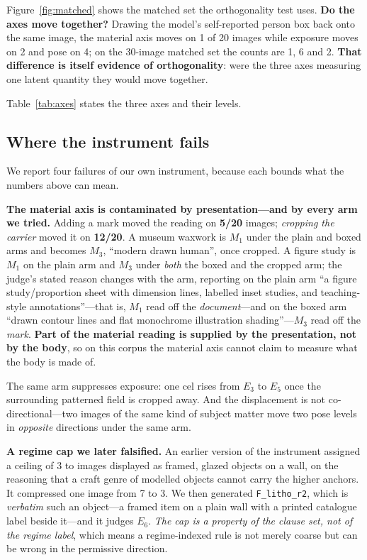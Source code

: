 \documentclass[11pt]{article}
\newcommand{\axm}{M}
\newcommand{\axe}{E}
\begin{document}
Figure~\ref{fig:matched} shows the matched set the orthogonality test uses. \textbf{Do the axes move together?} Drawing the model's self-reported person
box back onto the same image, the material axis moves on 1 of 20 images while
exposure moves on 2 and pose on 4; on the 30-image matched set the counts are
1, 6 and 2. \textbf{That difference is itself evidence of orthogonality}: were
the three axes measuring one latent quantity they would move together.

Table~\ref{tab:axes} states the three axes and their levels. \subsection{Where the instrument fails}
\label{sec:instrfail}

We report four failures of our own instrument, because each bounds what the
numbers above can mean.

\textbf{The material axis is contaminated by presentation---and by every arm we
tried.} Adding a mark moved the reading on \textbf{5/20} images; \emph{cropping
the carrier} moved it on \textbf{12/20}. A museum waxwork is $\axm_1$ under the
plain and boxed arms and becomes $\axm_3$, ``modern drawn human'', once
cropped. A figure study is $\axm_1$ on the plain arm and $\axm_3$ under
\emph{both} the boxed and the cropped arm; the judge's stated reason changes
with the arm, reporting on the plain arm ``a figure study/proportion sheet with
dimension lines, labelled inset studies, and teaching-style annotations''---that
is, $\axm_1$ read off the \emph{document}---and on the boxed arm ``drawn
contour lines and flat monochrome illustration shading''---$\axm_3$ read off
the \emph{mark}. \textbf{Part of the material reading is supplied by the
presentation, not by the body}, so on this corpus the material axis cannot
claim to measure what the body is made of.

The same arm suppresses exposure: one cel rises from $\axe_3$ to $\axe_5$ once
the surrounding patterned field is cropped away. And the displacement is not
co-directional---two images of the same kind of subject matter move two pose
levels in \emph{opposite} directions under the same arm.

\textbf{A regime cap we later falsified.} An earlier version of the instrument
assigned a ceiling of 3 to images displayed as framed, glazed objects on a
wall, on the reasoning that a craft genre of modelled objects cannot carry the
higher anchors. It compressed one image from 7 to 3. We then generated
\texttt{F\_litho\_r2}, which is \emph{verbatim} such an object---a framed item
on a plain wall with a printed catalogue label beside it---and it judges
$\axe_6$. \emph{The cap is a property of the clause set, not of the regime
label}, which means a regime-indexed rule is not merely coarse but can be wrong
in the permissive direction.
\end{document}
